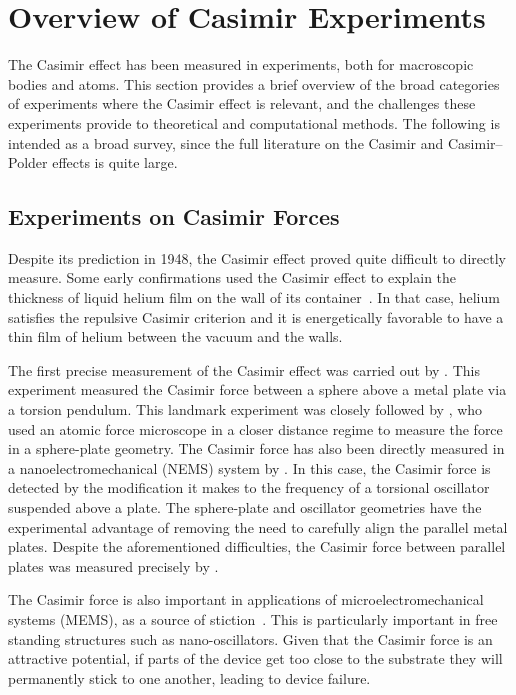 \section{Overview of Casimir Experiments}
\label{sec:expt_review}

The Casimir effect has been measured in experiments, both for macroscopic bodies and atoms.
This section provides a brief overview of the broad categories of experiments where the Casimir effect is relevant,
and the challenges these experiments provide to theoretical and computational methods.    
The following is intended as a broad survey, since the full literature on the Casimir and Casimir--Polder 
effects is quite large.  

\subsection{Experiments on Casimir Forces}

Despite its prediction in 1948, the Casimir effect proved quite difficult to directly measure.
Some early confirmations used the Casimir effect to explain the thickness of liquid helium film on 
the wall of its container~\citep{Sabisky1973,Dzyaloshinskii1961}.
In that case, helium satisfies the repulsive Casimir criterion and it is energetically favorable
to have a thin film of helium between the vacuum and the walls.  

The first precise measurement of the Casimir effect was carried out by \citet{Lamoreaux1997}.   
This experiment measured the Casimir force between a sphere above a metal plate
 via a torsion pendulum.
This landmark experiment was closely followed by \citet{Mohideen1998},
who used an atomic force microscope in a closer distance regime to measure the force in a sphere-plate geometry.
The Casimir force has also been directly measured in a nanoelectromechanical (NEMS) system 
by \citet{Chan2001}.  In this case, the Casimir force is detected by the modification it
makes to the frequency of a torsional oscillator suspended above a plate.  
The sphere-plate and oscillator geometries have the experimental advantage of removing the need to carefully
align the parallel metal plates. %
Despite the aforementioned difficulties, the Casimir force between parallel plates was measured precisely by \citet{Bressi2002}.  

The Casimir force is also important in applications of microelectromechanical systems (MEMS), 
as a source of stiction~\citep{Tas1996, Serry1998, Buks2001}.  This is particularly important
in free standing structures such as nano-oscillators.  
Given that the Casimir force is an attractive potential, if parts of the device get too close to the substrate
they will permanently stick to one another, leading to device failure.  

